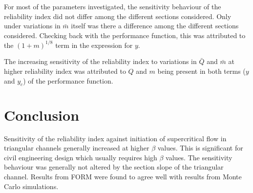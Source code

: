 \documentclass[a4paper]{article}
\begin{document}
For most of the parameters investigated, the sensitivity behaviour of 
the reliability index did not differ among the different sections considered.
Only under variations in $\bar{m}$ itself was there a difference
among the different sections considered. 
Checking back with the performance function, this was attributed to
the $(1+m)^{1/8}$ term in the expression for $y$. 

The increasing sensitivity of the reliability index to variations in 
$\bar{Q}$ and $\bar{m}$ at higher reliability index was attributed
to $Q$ and $m$ being present in both terms ($y$ and $y_c$) of the
performance function.


\section{Conclusion}
Sensitivity of the reliability index against initiation of supercritical
flow in triangular channels generally increased at higher $\beta$ values.
This is significant for civil engineering design which usually requires
high $\beta$ values.
The sensitivity behaviour was generally not altered by the section slope of the
triangular channel. 
Results from FORM were found to agree well with results from Monte Carlo
simulations.
\end{document}
